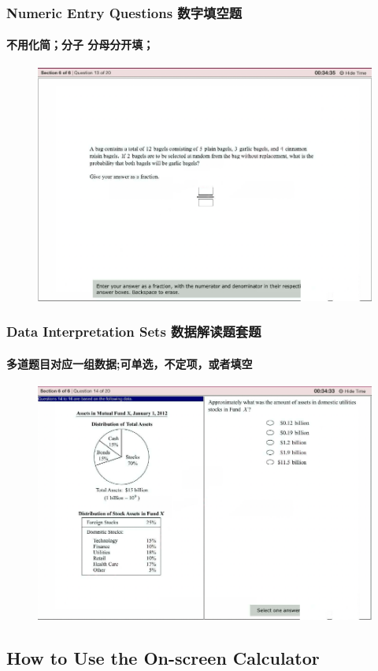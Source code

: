\documentclass[
	11pt, %
]{beamer}
\begin{document}
\begin{frame}
	\frametitle{Numeric Entry Questions 数字填空题}
	\framesubtitle{不用化简；分子 分母分开填；}
	\begin{figure}
		\includegraphics[width=0.9\linewidth]{Numeric_Entry_Questions2.png}
	\end{figure}
\end{frame}

\begin{frame}
	\frametitle{Data Interpretation Sets 数据解读题套题}
	\framesubtitle{多道题目对应一组数据;可单选，不定项，或者填空}
	\begin{figure}
		\includegraphics[width=0.9\linewidth]{Data_Interpretation_Sets.png}
	\end{figure}
\end{frame}

\subsection{How to Use the On-screen Calculator}
\end{document}
